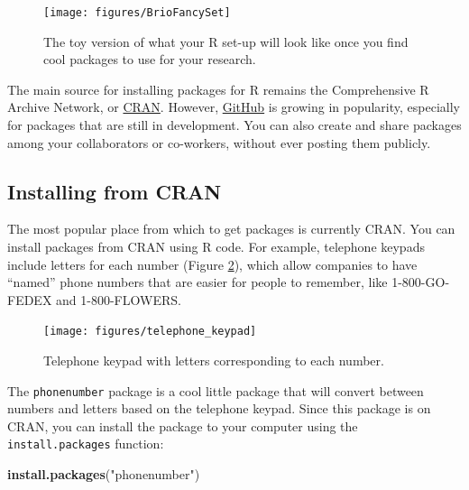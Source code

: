 \documentclass[]{book}
\makeatletter
\newenvironment{Shaded}{\begin{snugshade}}{\end{snugshade}}
\newcommand{\KeywordTok}[1]{\textcolor[rgb]{0.13,0.29,0.53}{\textbf{{#1}}}}
\newcommand{\StringTok}[1]{\textcolor[rgb]{0.31,0.60,0.02}{{#1}}}
\newcommand{\NormalTok}[1]{{#1}}
\newenvironment{kframe}{%
\medskip{}
\setlength{\fboxsep}{.8em}
 \def\at@end@of@kframe{}%
 \ifinner\ifhmode%
  \def\at@end@of@kframe{\end{minipage}}%
  \begin{minipage}{\columnwidth}%
 \fi\fi%
 \def\FrameCommand##1{\hskip\@totalleftmargin \hskip-\fboxsep
 \colorbox{shadecolor}{##1}\hskip-\fboxsep
     \hskip-\linewidth \hskip-\@totalleftmargin \hskip\columnwidth}%
 \MakeFramed {\advance\hsize-\width
   \@totalleftmargin\z@ \linewidth\hsize
   \@setminipage}}%
 {\par\unskip\endMakeFramed%
 \at@end@of@kframe}
\renewenvironment{Shaded}{\begin{kframe}}{\end{kframe}}
\makeatother
\begin{document}
\begin{figure}

{\centering \texttt{[image: figures/BrioFancySet]} 

}

\caption{The toy version of what your R set-up will look like once you find cool packages to use for your research.}\label{fig:toy-train-fancy}
\end{figure}

The main source for installing packages for R remains the Comprehensive
R Archive Network, or \href{https://cran.r-project.org}{CRAN}. However,
\href{https://github.com}{GitHub} is growing in popularity, especially
for packages that are still in development. You can also create and
share packages among your collaborators or co-workers, without ever
posting them publicly.

\subsection{Installing from CRAN}\label{installing-from-cran}

The most popular place from which to get packages is currently CRAN. You
can install packages from CRAN using R code. For example, telephone
keypads include letters for each number (Figure \ref{fig:phone-keypad}),
which allow companies to have ``named'' phone numbers that are easier
for people to remember, like 1-800-GO-FEDEX and 1-800-FLOWERS.

\begin{figure}

{\centering \texttt{[image: figures/telephone\_keypad]} 

}

\caption{Telephone keypad with letters corresponding to each number.}\label{fig:phone-keypad}
\end{figure}

The \texttt{phonenumber} package is a cool little package that will
convert between numbers and letters based on the telephone keypad. Since
this package is on CRAN, you can install the package to your computer
using the \texttt{install.packages} function:

\begin{Shaded}
\begin{Highlighting}[]
\KeywordTok{install.packages}\NormalTok{(}\StringTok{"phonenumber"}\NormalTok{)}
\end{Highlighting}
\end{Shaded}
\end{document}
